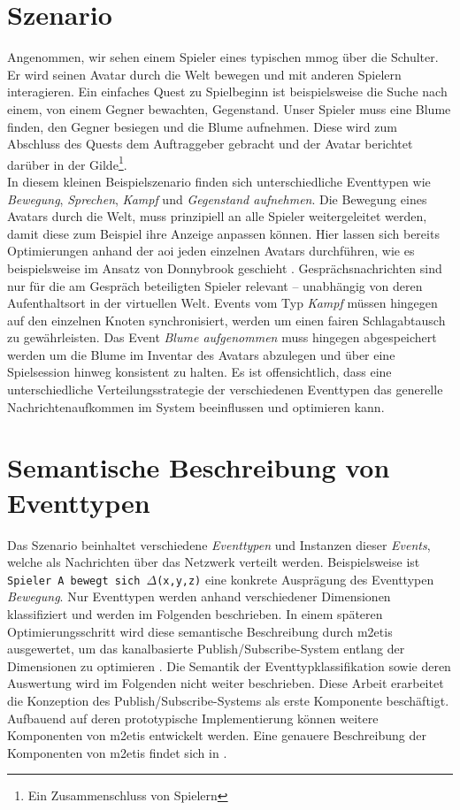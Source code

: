\section{Szenario}
\label{chap:grundlagen:szenario}
Angenommen, wir sehen einem Spieler eines typischen \ac{mmog} über die Schulter. Er wird seinen Avatar durch die Welt bewegen und mit anderen Spielern interagieren. Ein einfaches Quest zu Spielbeginn ist beispielsweise die Suche nach einem, von einem Gegner bewachten, Gegenstand. Unser Spieler muss eine Blume finden, den Gegner besiegen und die Blume aufnehmen. Diese wird zum Abschluss des Quests dem Auftraggeber gebracht und der Avatar berichtet darüber in der Gilde\footnote{Ein Zusammenschluss von Spielern}.\\
In diesem kleinen Beispielszenario finden sich unterschiedliche Eventtypen wie \emph{Bewegung}, \emph{Sprechen}, \emph{Kampf} und \emph{Gegenstand aufnehmen}. Die Bewegung eines Avatars durch die Welt, muss prinzipiell an alle Spieler weitergeleitet werden, damit diese zum Beispiel ihre Anzeige anpassen können. Hier lassen sich bereits Optimierungen anhand der \ac{aoi} jeden einzelnen Avatars durchführen, wie es beispielsweise im Ansatz von Donnybrook geschieht \cite{Bharambe2008Donnybrook}. Gesprächsnachrichten sind nur für die am Gespräch beteiligten Spieler relevant -- unabhängig von deren Aufenthaltsort in der virtuellen Welt. Events vom Typ \emph{Kampf} müssen hingegen auf den einzelnen Knoten synchronisiert, werden um einen fairen Schlagabtausch zu gewährleisten. Das Event \emph{Blume aufgenommen} muss hingegen abgespeichert werden um die Blume im Inventar des Avatars abzulegen und über eine Spielsession hinweg konsistent zu halten. Es ist offensichtlich, dass eine unterschiedliche Verteilungsstrategie der verschiedenen Eventtypen das generelle Nachrichtenaufkommen im System beeinflussen und optimieren kann.

\section{Semantische Beschreibung von Eventtypen}
Das Szenario beinhaltet verschiedene \emph{Eventtypen} und Instanzen dieser \emph{Events}, welche als Nachrichten über das Netzwerk verteilt werden. Beispielsweise ist \texttt{Spieler A bewegt sich $\Delta$(x,y,z)} eine konkrete Ausprägung des Eventtypen \emph{Bewegung}. Nur Eventtypen werden anhand verschiedener Dimensionen klassifiziert und werden im Folgenden beschrieben. In einem späteren Optimierungsschritt wird diese semantische Beschreibung durch \ac{m2etis} ausgewertet, um das kanalbasierte Publish/Subscribe-System entlang der Dimensionen zu optimieren \cite{Fischer2010a}. Die Semantik der Eventtypklassifikation sowie deren Auswertung wird im Folgenden nicht weiter beschrieben. Diese Arbeit erarbeitet die Konzeption des Publish/Subscribe-Systems als erste Komponente beschäftigt. Aufbauend auf deren prototypische Implementierung können weitere Komponenten von \ac{m2etis} entwickelt werden. Eine genauere Beschreibung der Komponenten von \ac{m2etis} findet sich in .

